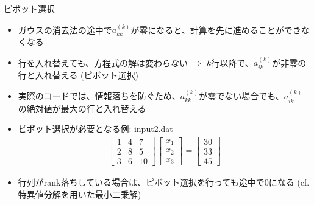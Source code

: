 \begin{frame}[t,fragile]{ピボット選択}
  \begin{itemize}
  \item ガウスの消去法の途中で$a_{kk}^{(k)}$が零になると、計算を先に進めることができなくなる
  \item 行を入れ替えても、方程式の解は変わらない $\Rightarrow$ $k$行以降で、$a_{ik}^{(k)}$が非零の行と入れ替える (ピボット選択)
  \item 実際のコードでは、情報落ちを防ぐため、$a_{kk}^{(k)}$が零でない場合でも、$a_{ik}^{(k)}$の絶対値が最大の行と入れ替える
  \item ピボット選択が必要となる例: \href{https://github.com/todo-group/computer-experiments/blob/master/exercise/linear_system/input2.dat}{input2.dat}
    \begin{align*}
      \begin{bmatrix} 1 & 4 & 7 \\ 2 & 8 & 5 \\ 3 & 6 & 10 \end{bmatrix} \begin{bmatrix} x_1 \\ x_2 \\ x_3 \end{bmatrix} = \begin{bmatrix} 30 \\ 33 \\ 45 \end{bmatrix}
    \end{align*}
    \item 行列がrank落ちしている場合は、ピボット選択を行っても途中で0になる (cf. 特異値分解を用いた最小二乗解)
  \end{itemize}
\end{frame}
